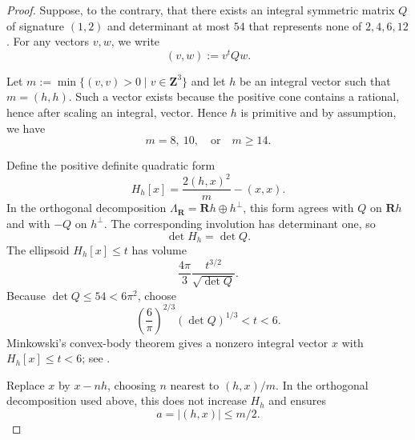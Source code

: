\documentclass[12pt]{amsart}
\numberwithin{equation}{section}
\theoremstyle{definition}
\theoremstyle{remark}
\newcommand{\Z}{\mathbf Z}
\newcommand{\R}{\mathbf R}
\begin{document}
\begin{proof}
Suppose, to the contrary, that there exists an integral symmetric matrix \(Q\) of signature \((1,2)\) and determinant at most \(54\) that represents none of \(2,4,6,12\). For any vectors \(v,w\), we write
$$
(v,w):=v^tQw.
$$
  
Let $m:=\min\{(v,v)>0\;\vert\; v\in \Z^3\}$ and let $h$ be an integral vector such that $m = (h,h)$.
Such a vector exists because the positive cone contains a rational,
hence after scaling an integral, vector.  
Hence $h$ is primitive and by assumption, we have
\begin{equation}\label{eq:m-possibilities}
                         m=8,\ 10,\quad\text{or}\quad m\geq14.
\end{equation}

Define the positive definite quadratic form
\[
                  H_h[x]=\frac{2(h,x)^2}{m}-(x,x).
\]
In the orthogonal decomposition
$\Lambda_\R=\R h\oplus h^\perp$, this form agrees with $Q$ on
$\R h$ and with $-Q$ on $h^\perp$.  The corresponding involution has
determinant one, so
\[
                              \det H_h=\det Q.
\]
The ellipsoid $H_h[x]\leq t$ has volume
\[
                    \frac{4\pi}{3}\frac{t^{3/2}}{\sqrt{\det Q}}.
\]
Because $\det Q\leq54<6\pi^2$, choose
\[
     \left(\frac{6}{\pi}\right)^{2/3}(\det Q)^{1/3}<t<6.
\]
Minkowski's convex-body theorem gives a nonzero integral vector $x$ with
$H_h[x]\leq t<6$; see \cite[Chapter~III, \S2]{Cassels}.

Replace $x$ by $x-nh$, choosing $n$ nearest to $(h,x)/m$.  In the
orthogonal decomposition used above, this does not increase $H_h$ and
ensures
\begin{equation}\label{am_inequality}
    a=|(h,x)|\leq m/2.
\end{equation}


\end{proof}
\end{document}

